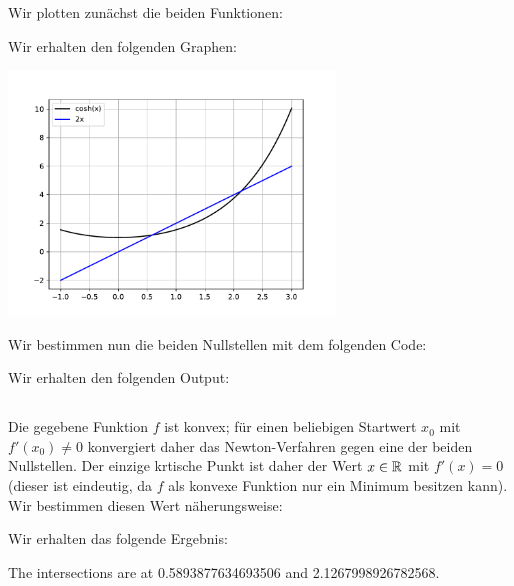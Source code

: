 \section{}



\subsection{}

Wir plotten zunächst die beiden Funktionen:



Wir erhalten den folgenden Graphen:

\begin{center}
  \includegraphics[width = 0.65\textwidth]{chapter_04/exercise_04_15_figure.pdf}
\end{center}

Wir bestimmen nun die beiden Nullstellen mit dem folgenden Code:



Wir erhalten den folgenden Output:




\subsection{}

Die gegebene Funktion $f$ ist konvex;
für einen beliebigen Startwert $x_0$ mit $f'(x_0) $ konvergiert daher das Newton-Verfahren gegen eine der beiden Nullstellen.
Der einzige krtische Punkt ist daher der Wert $x \in \mathbb{R}$ mit $f'(x) = 0$ (dieser ist eindeutig, da $f$ als konvexe Funktion nur ein Minimum besitzen kann).
Wir bestimmen diesen Wert näherungsweise:



Wir erhalten das folgende Ergebnis:

\begin{consoleoutput}
The intersections are at 0.5893877634693506 and 2.1267998926782568.
\end{consoleoutput}

